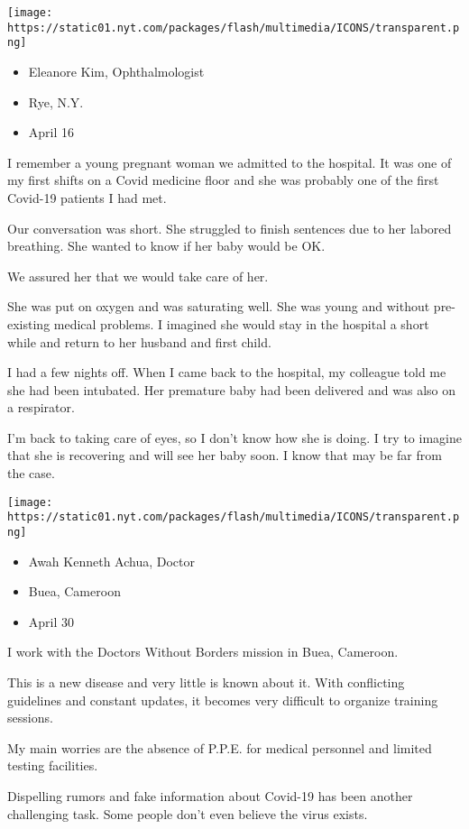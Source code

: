 \texttt{[image: https://static01.nyt.com/packages/flash/multimedia/ICONS/transparent.png]}

\begin{itemize}
\tightlist
\item
  Eleanore Kim, Ophthalmologist
\item
  Rye, N.Y.
\item
  April 16
\end{itemize}

I remember a young pregnant woman we admitted to the hospital. It was
one of my first shifts on a Covid medicine floor and she was probably
one of the first Covid-19 patients I had met.

Our conversation was short. She struggled to finish sentences due to her
labored breathing. She wanted to know if her baby would be OK.

We assured her that we would take care of her.

She was put on oxygen and was saturating well. She was young and without
pre-existing medical problems. I imagined she would stay in the hospital
a short while and return to her husband and first child.

I had a few nights off. When I came back to the hospital, my colleague
told me she had been intubated. Her premature baby had been delivered
and was also on a respirator.

I'm back to taking care of eyes, so I don't know how she is doing. I try
to imagine that she is recovering and will see her baby soon. I know
that may be far from the case.

\texttt{[image: https://static01.nyt.com/packages/flash/multimedia/ICONS/transparent.png]}

\begin{itemize}
\tightlist
\item
  Awah Kenneth Achua, Doctor
\item
  Buea, Cameroon
\item
  April 30
\end{itemize}

I work with the Doctors Without Borders mission in Buea, Cameroon.

This is a new disease and very little is known about it. With
conflicting guidelines and constant updates, it becomes very difficult
to organize training sessions.

My main worries are the absence of P.P.E. for medical personnel and
limited testing facilities.

Dispelling rumors and fake information about Covid-19 has been another
challenging task. Some people don't even believe the virus exists.

